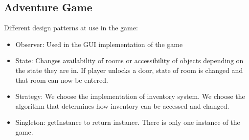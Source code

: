 \documentclass[a4paper, 11pt]{article}
\begin{document}
    \subsection{Adventure Game}
        Different design patterns at use in the game:
        \begin{itemize}
            \item Observer: Used in the GUI implementation of the game
            \item State: Changes availability of rooms or accessibility of objects depending on the state they are in. If player unlocks a door, state of room is changed and that room can now be entered.
            \item Strategy: We choose the implementation of inventory system. We choose the algorithm that determines how inventory can be accessed and changed.
            \item Singleton: getInstance to return instance. There is only one instance of the game.
        \end{itemize}
\end{document}
